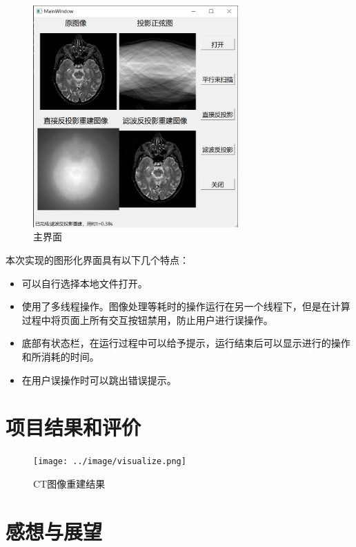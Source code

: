 \documentclass[UTF8]{ctexart}
\begin{document}
\begin{figure}[H]
    \centering
    \includegraphics[width=0.7\textwidth]{../image/main_UI.png}
    \caption{主界面}
    \label{fig UI}
\end{figure}

本次实现的图形化界面具有以下几个特点：
\begin{itemize}
    \item 可以自行选择本地文件打开。
    \item 使用了多线程操作。图像处理等耗时的操作运行在另一个线程下，但是在计算过程中将页面上所有交互按钮禁用，防止用户进行误操作。
    \item 底部有状态栏，在运行过程中可以给予提示，运行结束后可以显示进行的操作和所消耗的时间。
    \item 在用户误操作时可以跳出错误提示。
\end{itemize}

\section{项目结果和评价}
\begin{figure}[H]
    \centering
    \texttt{[image: ../image/visualize.png]}
    \caption{CT图像重建结果}
    \label{fig reult}
\end{figure}
    


\section{感想与展望}
\end{document}
